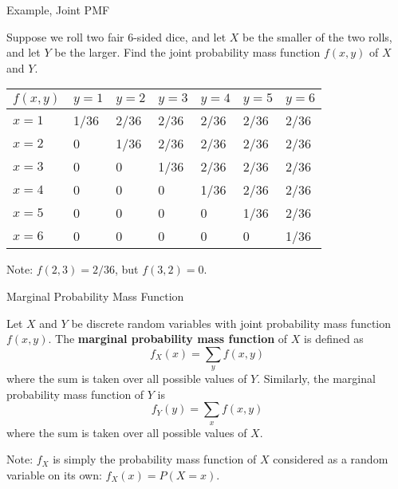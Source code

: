 \documentclass[handout]{beamer}
\begin{document}
\begin{frame}{Example, Joint PMF}
    \begin{block}{}
        Suppose we roll two fair 6-sided dice, and let $X$ be the smaller of the two rolls, and let $Y$ be the larger. Find the joint probability mass function $f(x,y)$ of $X$ and $Y$.
    \end{block}
    \pause
    \begin{center}
        \begin{tabular}{l||l|l|l|l|l|l}
            $f(x,y)$ & $y=1$ & $y=2$ & $y=3$ & $y=4$ & $y=5$ & $y=6$ \\ \hline\hline
            $x=1$    & 1/36  & 2/36  & 2/36  & 2/36  & 2/36  & 2/36  \\ \hline
            $x=2$    & 0     & 1/36  & 2/36  & 2/36  & 2/36  & 2/36  \\ \hline
            $x=3$    & 0     & 0     & 1/36  & 2/36  & 2/36  & 2/36  \\ \hline
            $x=4$    & 0     & 0     & 0     & 1/36  & 2/36  & 2/36  \\ \hline
            $x=5$    & 0     & 0     & 0     & 0     & 1/36  & 2/36  \\ \hline
            $x=6$    & 0     & 0     & 0     & 0     & 0     & 1/36
        \end{tabular}
    \end{center}

    Note: $f(2,3)=2/36$, but $f(3,2)=0$.
\end{frame}
\begin{frame}{Marginal Probability Mass Function}
    \begin{block}{}
        Let $X$ and $Y$ be discrete random variables with joint probability mass function $f(x,y)$. The \textbf{marginal probability mass function} of $X$ is defined as
        $$f_X(x) = \sum_y f(x,y)$$
        where the sum is taken over all possible values of $Y$. Similarly, the marginal probability mass function of $Y$ is
        $$f_Y(y) = \sum_x f(x,y)$$
        where the sum is taken over all possible values of $X$.
    \end{block}

    Note: $f_X$ is simply the probability mass function of $X$ considered as a random variable on its own: $f_X(x) = P(X=x)$.
\end{frame}
\end{document}
